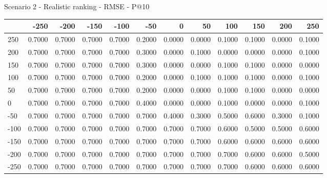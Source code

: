 Scenario 2 - Realistic ranking - RMSE - P@10
\begin{tabular}{lrrrrrrrrrrr}
\toprule
{} &   -250 &   -200 &   -150 &   -100 &   -50  &    0   &    50  &    100 &    150 &    200 &    250 \\
\midrule
 250 & 0.7000 & 0.7000 & 0.7000 & 0.7000 & 0.2000 & 0.0000 & 0.0000 & 0.1000 & 0.1000 & 0.0000 & 0.1000 \\
 200 & 0.7000 & 0.7000 & 0.7000 & 0.7000 & 0.3000 & 0.0000 & 0.1000 & 0.0000 & 0.0000 & 0.0000 & 0.1000 \\
 150 & 0.7000 & 0.7000 & 0.7000 & 0.7000 & 0.3000 & 0.0000 & 0.0000 & 0.1000 & 0.1000 & 0.0000 & 0.0000 \\
 100 & 0.7000 & 0.7000 & 0.7000 & 0.7000 & 0.2000 & 0.0000 & 0.1000 & 0.1000 & 0.1000 & 0.0000 & 0.1000 \\
 50  & 0.7000 & 0.7000 & 0.7000 & 0.7000 & 0.2000 & 0.0000 & 0.0000 & 0.1000 & 0.1000 & 0.0000 & 0.0000 \\
 0   & 0.7000 & 0.7000 & 0.7000 & 0.7000 & 0.4000 & 0.0000 & 0.0000 & 0.1000 & 0.0000 & 0.0000 & 0.1000 \\
-50  & 0.7000 & 0.7000 & 0.7000 & 0.7000 & 0.7000 & 0.4000 & 0.3000 & 0.5000 & 0.6000 & 0.3000 & 0.1000 \\
-100 & 0.7000 & 0.7000 & 0.7000 & 0.7000 & 0.7000 & 0.7000 & 0.7000 & 0.6000 & 0.5000 & 0.5000 & 0.6000 \\
-150 & 0.7000 & 0.7000 & 0.7000 & 0.7000 & 0.7000 & 0.7000 & 0.7000 & 0.6000 & 0.6000 & 0.6000 & 0.6000 \\
-200 & 0.7000 & 0.7000 & 0.7000 & 0.7000 & 0.7000 & 0.7000 & 0.7000 & 0.7000 & 0.6000 & 0.6000 & 0.5000 \\
-250 & 0.7000 & 0.7000 & 0.7000 & 0.7000 & 0.7000 & 0.7000 & 0.7000 & 0.7000 & 0.6000 & 0.6000 & 0.6000 \\
\bottomrule
\end{tabular}

